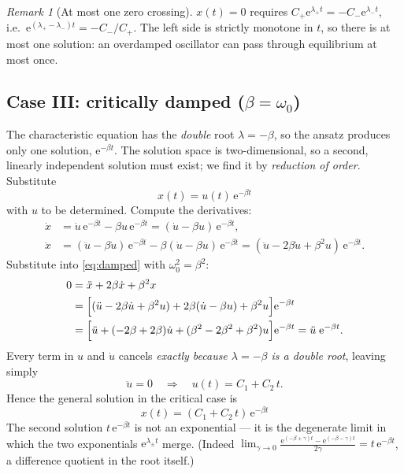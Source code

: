 \documentclass[11pt]{article}
\theoremstyle{plain}
\theoremstyle{definition}
\theoremstyle{remark}
\newtheorem{remark}[lemma]{Remark}
\newcommand{\ee}{\mathrm{e}}
\begin{document}
\begin{remark}[At most one zero crossing]
$x(t)=0$ requires $C_+\ee^{\lambda_+t} = -C_-\ee^{\lambda_-t}$, i.e.\
$\ee^{(\lambda_+-\lambda_-)t} = -C_-/C_+$. The left side is strictly monotone
in $t$, so there is at most one solution: an overdamped oscillator can pass
through equilibrium at most once.
\end{remark}

\subsection{Case III: critically damped ($\beta = \omega_0$)}
\label{sec:critical}

The characteristic equation has the \emph{double} root $\lambda = -\beta$, so
the ansatz produces only one solution, $\ee^{-\beta t}$. The solution space is
two-dimensional, so a second, linearly independent solution must exist; we
find it by \emph{reduction of order}. Substitute
\begin{equation}
  x(t) = u(t)\,\ee^{-\beta t}
\end{equation}
with $u$ to be determined. Compute the derivatives:
\begin{align}
  \dot x &= \dot u\, \ee^{-\beta t} - \beta u\, \ee^{-\beta t}
          = (\dot u - \beta u)\,\ee^{-\beta t}, \\
  \ddot x &= (\ddot u - \beta\dot u)\,\ee^{-\beta t}
           - \beta(\dot u - \beta u)\,\ee^{-\beta t}
          = (\ddot u - 2\beta \dot u + \beta^2 u)\,\ee^{-\beta t}.
\end{align}
Substitute into \eqref{eq:damped} with $\omega_0^2 = \beta^2$:
\begin{align}
  0 &= \ddot x + 2\beta\dot x + \beta^2 x \nonumber\\
    &= \Bigl[(\ddot u - 2\beta\dot u + \beta^2 u)
       + 2\beta(\dot u - \beta u) + \beta^2 u\Bigr]\ee^{-\beta t} \nonumber\\
    &= \Bigl[\ddot u + (-2\beta + 2\beta)\dot u
       + (\beta^2 - 2\beta^2 + \beta^2) u\Bigr]\ee^{-\beta t}
     = \ddot u \; \ee^{-\beta t}.
\end{align}
Every term in $u$ and $\dot u$ cancels \emph{exactly because $\lambda=-\beta$
is a double root}, leaving simply
\begin{equation}
  \ddot u = 0
  \quad\Longrightarrow\quad
  u(t) = C_1 + C_2\, t .
\end{equation}
Hence the general solution in the critical case is
\begin{equation}
  \boxed{\;
  x(t) = (C_1 + C_2\, t)\,\ee^{-\beta t}
  \;}
\end{equation}
The second solution $t\,\ee^{-\beta t}$ is not an exponential --- it is the
degenerate limit in which the two exponentials $\ee^{\lambda_\pm t}$ merge.
(Indeed
$\lim_{\gamma\to 0}\frac{\ee^{(-\beta+\gamma)t} - \ee^{(-\beta-\gamma)t}}{2\gamma}
= t\,\ee^{-\beta t}$, a difference quotient in the root itself.)
\end{document}
